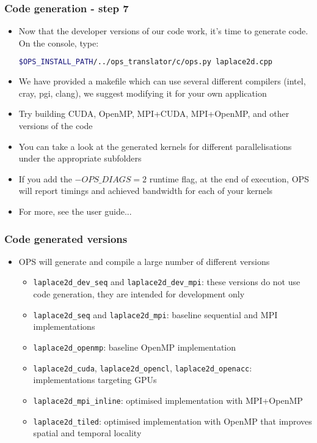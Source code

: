 \documentclass{beamer}
\begin{document}
\begin{frame}[fragile]
\frametitle{Code generation - step 7}
\begin{itemize}
\item Now that the developer versions of our code work, it's time to generate code. On the console, type:
\begin{lstlisting}[language=bash,basicstyle=\tiny]
$OPS_INSTALL_PATH/../ops_translator/c/ops.py laplace2d.cpp
\end{lstlisting}
\item We have provided a makefile which can use several different compilers (intel, cray, pgi, clang), we suggest modifying it for your own application
\item Try building CUDA, OpenMP, MPI+CUDA, MPI+OpenMP, and other versions of the code
\item You can take a look at the generated kernels for different parallelisations under the appropriate subfolders
\item If you add the $-OPS\_DIAGS=2$ runtime flag, at the end of execution, OPS will report timings and achieved bandwidth for each of your kernels
\item For more, see the user guide...
\end{itemize}
\end{frame}

\begin{frame}[fragile]
\frametitle{Code generated versions}
\begin{itemize}
\item OPS will generate and compile a large number of different versions
\begin{itemize}
  \item \texttt{laplace2d\_dev\_seq} and \texttt{laplace2d\_dev\_mpi}: these versions do not use code generation, they are intended for development only
  \item \texttt{laplace2d\_seq} and \texttt{laplace2d\_mpi}: baseline sequential and MPI implementations
  \item \texttt{laplace2d\_openmp}: baseline OpenMP implementation
  \item \texttt{laplace2d\_cuda}, \texttt{laplace2d\_opencl}, \texttt{laplace2d\_openacc}: implementations targeting GPUs
  \item \texttt{laplace2d\_mpi\_inline}: optimised implementation with MPI+OpenMP
  \item \texttt{laplace2d\_tiled}: optimised implementation with OpenMP that improves spatial and temporal locality
\end{itemize}
\end{itemize}
\end{frame}
\end{document}
